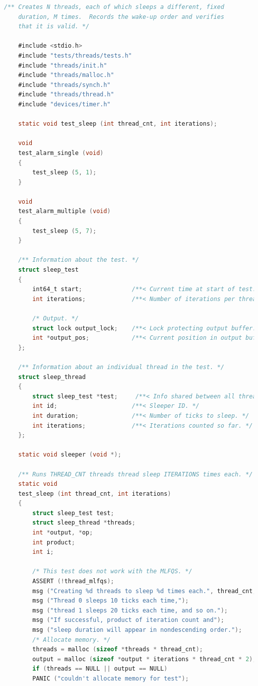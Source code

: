 \documentclass{article}
\begin{document}
\begin{lstlisting}[language=C, title=\texttt{pintos/src/tests/threads/alarm-wait.c}]
	/** Creates N threads, each of which sleeps a different, fixed
	duration, M times.  Records the wake-up order and verifies
	that it is valid. */
	
	#include <stdio.h>
	#include "tests/threads/tests.h"
	#include "threads/init.h"
	#include "threads/malloc.h"
	#include "threads/synch.h"
	#include "threads/thread.h"
	#include "devices/timer.h"
	
	static void test_sleep (int thread_cnt, int iterations);
	
	void
	test_alarm_single (void) 
	{
		test_sleep (5, 1);
	}
	
	void
	test_alarm_multiple (void) 
	{
		test_sleep (5, 7);
	}
	
	/** Information about the test. */
	struct sleep_test 
	{
		int64_t start;              /**< Current time at start of test. */
		int iterations;             /**< Number of iterations per thread. */
		
		/* Output. */
		struct lock output_lock;    /**< Lock protecting output buffer. */
		int *output_pos;            /**< Current position in output buffer. */
	};
	
	/** Information about an individual thread in the test. */
	struct sleep_thread 
	{
		struct sleep_test *test;     /**< Info shared between all threads. */
		int id;                     /**< Sleeper ID. */
		int duration;               /**< Number of ticks to sleep. */
		int iterations;             /**< Iterations counted so far. */
	};
	
	static void sleeper (void *);
	
	/** Runs THREAD_CNT threads thread sleep ITERATIONS times each. */
	static void
	test_sleep (int thread_cnt, int iterations) 
	{
		struct sleep_test test;
		struct sleep_thread *threads;
		int *output, *op;
		int product;
		int i;
		
		/* This test does not work with the MLFQS. */
		ASSERT (!thread_mlfqs);
		msg ("Creating %d threads to sleep %d times each.", thread_cnt, iterations);
		msg ("Thread 0 sleeps 10 ticks each time,");
		msg ("thread 1 sleeps 20 ticks each time, and so on.");
		msg ("If successful, product of iteration count and");
		msg ("sleep duration will appear in nondescending order.");
		/* Allocate memory. */
		threads = malloc (sizeof *threads * thread_cnt);
		output = malloc (sizeof *output * iterations * thread_cnt * 2);
		if (threads == NULL || output == NULL)
		PANIC ("couldn't allocate memory for test");
		

\end{lstlisting}
\end{document}
